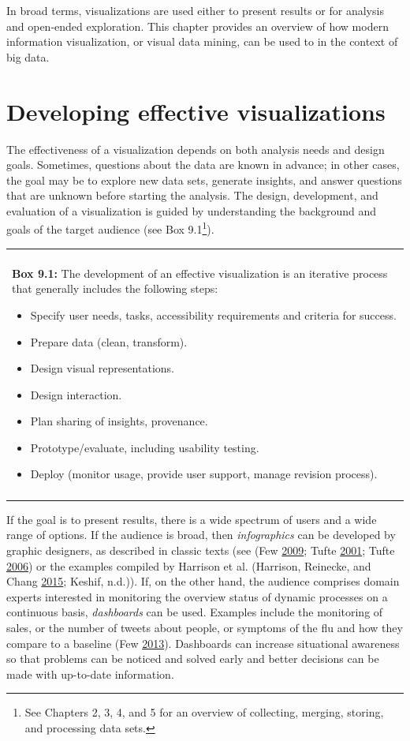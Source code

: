 \documentclass[]{krantz}
\newenvironment{F00}
    {\begin{center}
    \begin{tabular}{|p{0.9\textwidth}|}
    \hline\\
    }
    { 
    \\\\\hline
    \end{tabular} 
    \end{center}
    }
\begin{document}
In broad terms, visualizations are used either to present results or for
analysis and open-ended exploration. This chapter provides an overview
of how modern information visualization, or visual data mining, can be
used to in the context of big data.

\section{Developing effective visualizations}\label{sec:viz-2}

The effectiveness of a visualization depends on both analysis needs and
design goals. Sometimes, questions about the data are known in advance;
in other cases, the goal may be to explore new data sets, generate
insights, and answer questions that are unknown before starting the
analysis. The design, development, and evaluation of a visualization is
guided by understanding the background and goals of the target audience
(see Box 9.1\footnote{See Chapters 2, 3, 4, and 5 for an overview of
  collecting, merging, storing, and processing data sets.}).

\begin{F00}
\textbf{Box 9.1:} The development of an effective visualization is an
iterative process that generally includes the following steps:

\begin{itemize}
\item
  Specify user needs, tasks, accessibility requirements and criteria for
  success.
\item
  Prepare data (clean, transform).
\item
  Design visual representations.
\item
  Design interaction.
\item
  Plan sharing of insights, provenance.
\item
  Prototype/evaluate, including usability testing.
\item
  Deploy (monitor usage, provide user support, manage revision process).
\end{itemize}
\end{F00}

If the goal is to present results, there is a wide spectrum of users and
a wide range of options. If the audience is broad, then
\emph{infographics} can be developed by graphic designers, as described
in classic texts (see (Few \protect\hyperlink{ref-few2009now}{2009};
Tufte \protect\hyperlink{ref-edward2001visual}{2001}; Tufte
\protect\hyperlink{ref-edward2006beauty}{2006}) or the examples compiled
by Harrison et al. (Harrison, Reinecke, and Chang
\protect\hyperlink{ref-harrison2015infographic}{2015}; Keshif, n.d.)).
If, on the other hand, the audience comprises domain experts interested
in monitoring the overview status of dynamic processes on a continuous
basis, \emph{dashboards} can be used. Examples include the monitoring of
sales, or the number of tweets about people, or symptoms of the flu and
how they compare to a baseline (Few
\protect\hyperlink{ref-few2013information}{2013}). Dashboards can
increase situational awareness so that problems can be noticed and
solved early and better decisions can be made with up-to-date
information.
\end{document}
